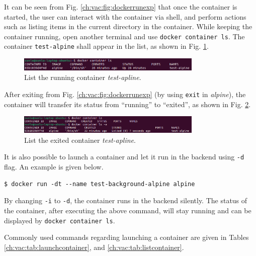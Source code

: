 It can be seen from Fig. \ref{ch:vac:fig:dockerrunexp} that once the container is started, the user can interact with the container via shell, and perform actions such as listing items in the current directory in the container. While keeping the container running, open another terminal and use \verb|docker container ls|. The container \verb|test-alpine| shall appear in the list, as shown in Fig. \ref{ch:vac:fig:dockerrunexppart2}.
\begin{figure}
	\centering
	\includegraphics[width=250pt]{chapters/ch-virtualization-and-containerization/figures/dockerrunexppart2.png}
	\caption{List the running container \textit{test-apline}.} \label{ch:vac:fig:dockerrunexppart2}
\end{figure}

After exiting from Fig. \ref{ch:vac:fig:dockerrunexp} (by using \verb|exit| in \textit{alpine}), the container will transfer its status from ``running'' to ``exited'', as shown in Fig. \ref{ch:vac:fig:dockerrunexppart3}.
\begin{figure}
	\centering
	\includegraphics[width=250pt]{chapters/ch-virtualization-and-containerization/figures/dockerrunexppart3.png}
	\caption{List the exited container \textit{test-apline}.} \label{ch:vac:fig:dockerrunexppart3}
\end{figure}

It is also possible to launch a container and let it run in the backend using \verb|-d| flag. An example is given below.
\begin{lstlisting}
$ docker run -dt --name test-background-alpine alpine
\end{lstlisting}
By changing \verb|-i| to \verb|-d|, the container runs in the backend silently. The status of the container, after executing the above command, will stay running and can be displayed by \verb|docker container ls|.

Commonly used commands regarding launching a container are given in Tables \ref{ch:vac:tab:launchcontainer}, and \ref{ch:vac:tab:listcontainer}.

